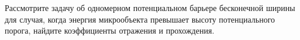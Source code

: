 \documentclass[__main__.tex]{subfiles}
\begin{document}
Рассмотрите задачу об одномерном потенциальном барьере бесконечной ширины для случая, когда энергия микрообъекта превышает высоту потенциального порога, найдите коэффициенты отражения и прохождения.\\ 

\end{document}
